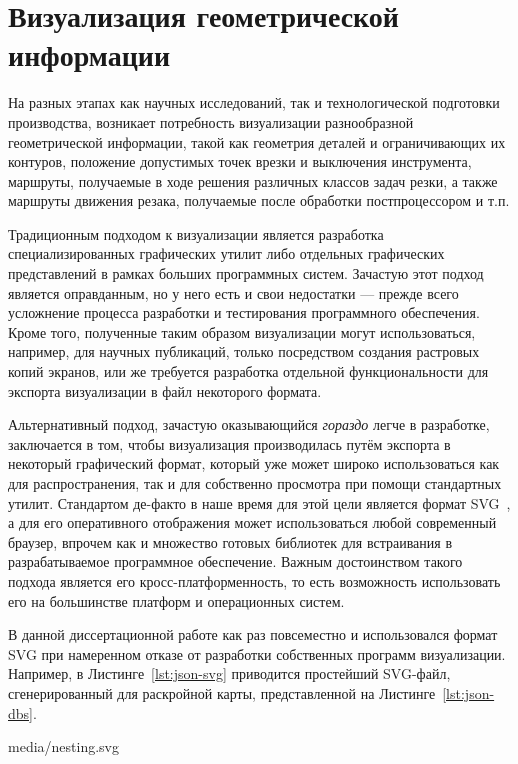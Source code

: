 
\section{%
  Визуализация геометрической информации
}
\label{sec:json.view}

На разных этапах
как научных исследований,
так и технологической подготовки производства,
возникает потребность визуализации разнообразной
геометрической информации,
такой как геометрия деталей
и ограничивающих их контуров,
положение допустимых точек врезки
и выключения инструмента,
маршруты,
получаемые в ходе
решения различных классов задач резки,
а также маршруты движения резака,
получаемые после обработки постпроцессором
и т.п.

Традиционным подходом к визуализации является
разработка специализированных графических утилит
либо отдельных графических представлений
в рамках больших программных систем.
Зачастую этот подход является оправданным,
но у него есть и свои недостатки ---
прежде всего усложнение процесса разработки
и тестирования программного обеспечения.
Кроме того,
полученные таким образом визуализации
могут использоваться,
например, для научных публикаций,
только посредством создания растровых копий экранов,
или же требуется разработка отдельной функциональности
для экспорта визуализации в файл некоторого формата.

Альтернативный подход,
зачастую оказывающийся
\textit{гораздо}
легче в разработке,
заключается в том,
чтобы визуализация производилась
путём экспорта в некоторый графический формат,
который уже может широко использоваться как
для распространения,
так и для собственно просмотра при помощи
стандартных утилит.
Стандартом де-факто в наше время
для этой цели является формат
SVG~\cite{bi:SVG},
а для его оперативного отображения
может использоваться любой современный браузер,
впрочем как и множество готовых библиотек
для встраивания в разрабатываемое программное обеспечение.
Важным достоинством такого подхода
является его кросс-платформенность,
то есть возможность использовать его
на большинстве платформ и операционных систем.

В данной диссертационной работе
как раз повсеместно и использовался формат SVG
при намеренном отказе от разработки
собственных программ визуализации.
Например,
в Листинге~\ref{lst:json-svg}
приводится простейший SVG-файл,
сгенерированный для раскройной карты,
представленной на Листинге~\ref{lst:json-dbs}.


  {media/nesting.svg}

